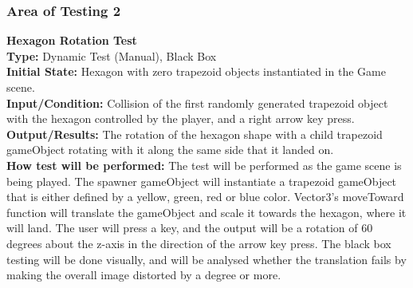 \documentclass[12pt, titlepage]{article}
\begin{document}
\subsubsection{Area of Testing 2}
\noindent \textbf{Hexagon Rotation Test} \\
\textbf{Type:}  Dynamic Test (Manual), Black Box\\
\textbf{Initial State:}  Hexagon with zero trapezoid objects instantiated in the Game scene.\\
\textbf{Input/Condition:}  Collision of the first randomly generated trapezoid object with the hexagon controlled by the player, and a right arrow key press.\\
\textbf{Output/Results:} The rotation of the hexagon shape with a child trapezoid gameObject rotating with it along the same side that it landed on.\\
\textbf{How test will be performed:} The test will be performed as the game scene is being played. The spawner gameObject will instantiate a trapezoid gameObject that is either defined by a yellow, green, red or blue color. Vector3’s moveToward function will translate the gameObject and scale it towards the hexagon, where it will land. The user will press a key, and the output will be a rotation of 60 degrees about the z-axis in the direction of the arrow key press. The black box testing will be done visually, and will be analysed whether the translation fails by making the overall image distorted by a degree or more. 
\end{document}
